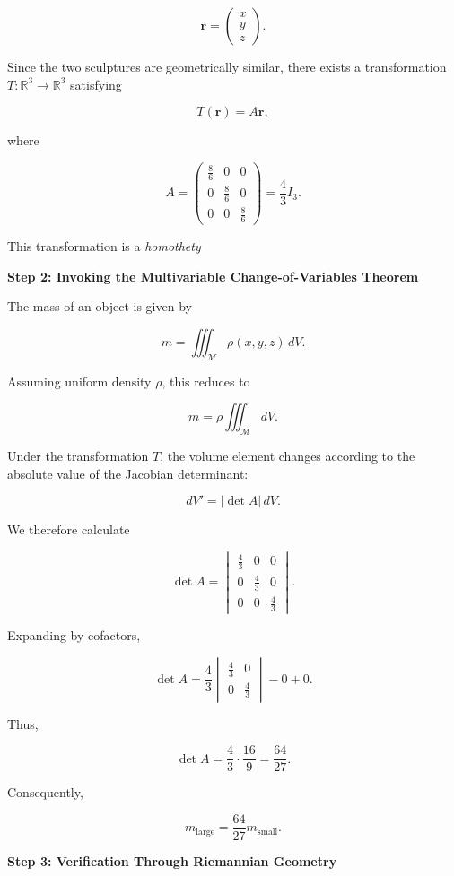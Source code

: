 \begin{enumerate}
 
 \[\mathbf{r}=\begin{pmatrix}x\\y\\z\end{pmatrix}.\]

 Since the two sculptures are geometrically similar, there exists a transformation $T:\mathbb{R}^3\to\mathbb{R}^3$ satisfying

 
 \[T(\mathbf{r})=A\mathbf{r},\]

 where

 
 \[A=\begin{pmatrix} \frac{8}{6}&0&0\\ 0&\frac{8}{6}&0\\ 0&0&\frac{8}{6} \end{pmatrix}=\frac43 I_3.\]

 This transformation is a \textit{homothety}

 \textbf{Step 2: Invoking the Multivariable Change-of-Variables Theorem}

 The mass of an object is given by

 
 \[m=\iiint_{\mathcal{M}}\rho(x,y,z)\,dV.\]

 Assuming uniform density $\rho$, this reduces to

 
 \[m=\rho\iiint_{\mathcal{M}}dV.\]

 Under the transformation $T$, the volume element changes according to the absolute value of the Jacobian determinant:

 
 \[dV'=|\det A|\,dV.\]

 We therefore calculate

 
 \[\det A=\begin{vmatrix} \frac43&0&0\\ 0&\frac43&0\\ 0&0&\frac43 \end{vmatrix}.\]

 Expanding by cofactors,

 
 \[\det A=\frac43\begin{vmatrix} \frac43&0\\ 0&\frac43 \end{vmatrix}-0+0.\]

 Thus,

 
 \[\det A=\frac43\cdot\frac{16}{9}=\frac{64}{27}.\]

 Consequently,

 
 \[m_{\mathrm{large}}=\frac{64}{27}m_{\mathrm{small}}.\]

 \textbf{Step 3: Verification Through Riemannian Geometry}


\end{enumerate}
